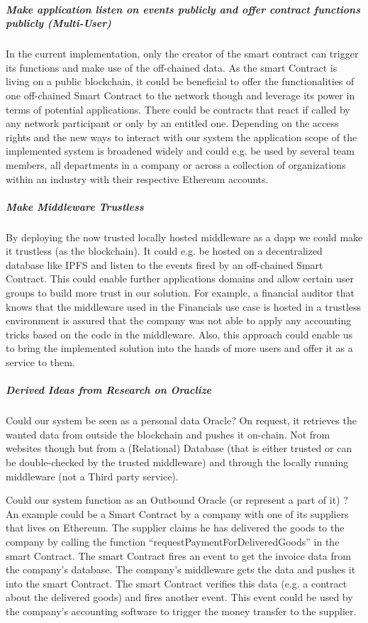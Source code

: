 \subparagraph{Make application listen on events publicly and offer contract functions publicly (Multi-User)}
In the current implementation, only the creator of the smart contract can trigger its functions and make use of the off-chained data. As the smart Contract is living on a public blockchain, it could be beneficial to offer the functionalities of one off-chained Smart Contract to the network though and leverage its power in terms of potential applications. There could be contracts that react if called by any network participant or only by an entitled one. Depending on the access rights and the new ways to interact with our system the application scope of the implemented system is broadened widely and could e.g. be used by several team members, all departments in a company or across a collection of organizations within an industry with their respective Ethereum accounts.

\subparagraph{Make Middleware Trustless}
By deploying the now trusted locally hosted middleware as a dapp we could make it trustless (as the blockchain). It could e.g. be hosted on a decentralized database like IPFS and listen to the events fired by an off-chained Smart Contract. This could enable further applications domains and allow certain user groups to build more trust in our solution. For example, a financial auditor that knows that the middleware used in the Financials use case is hosted in a trustless environment is assured that the company was not able to apply any accounting tricks based on the code in the middleware. Also, this approach could enable us to bring the implemented solution into the hands of more users and offer it as a service to them.

\subparagraph{Derived Ideas from Research on Oraclize}
Could our system be seen as a personal data Oracle? On request, it retrieves the wanted data from outside the blockchain and pushes it on-chain. Not from websites though but from a (Relational) Database (that is either trusted or can be double-checked by the trusted middleware) and through the locally running middleware (not a Third party service).

Could our system function as an Outbound Oracle (or represent a part of it) \cite{relatedWork01}?
An example could be a Smart Contract by a company with one of its suppliers that lives on Ethereum. The supplier claims he has delivered the goods to the company by calling the function “requestPaymentForDeliveredGoods” in the smart Contract. The smart Contract fires an event to get the invoice data from the company’s database. The company’s middleware gets the data and pushes it into the smart Contract. The smart Contract verifies this data (e.g. a contract about the delivered goods) and fires another event. This event could be used by the company’s accounting software to trigger the money transfer to the supplier.

